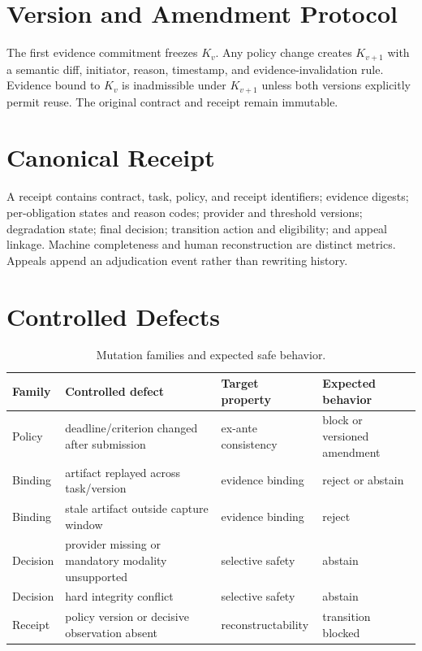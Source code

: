 \documentclass[sigconf,anonymous,review]{acmart}
\begin{document}
\section{Version and Amendment Protocol}
The first evidence commitment freezes $K_v$. Any policy change creates $K_{v+1}$ with a semantic diff, initiator, reason, timestamp, and evidence-invalidation rule. Evidence bound to $K_v$ is inadmissible under $K_{v+1}$ unless both versions explicitly permit reuse. The original contract and receipt remain immutable.

\section{Canonical Receipt}
A receipt contains contract, task, policy, and receipt identifiers; evidence digests; per-obligation states and reason codes; provider and threshold versions; degradation state; final decision; transition action and eligibility; and appeal linkage. Machine completeness and human reconstruction are distinct metrics. Appeals append an adjudication event rather than rewriting history.

\section{Controlled Defects}
\begin{table}[h]
\centering
\caption{Mutation families and expected safe behavior.}
\begin{tabular}{llll}
\toprule
Family & Controlled defect & Target property & Expected behavior \\
\midrule
Policy & deadline/criterion changed after submission & ex-ante consistency & block or versioned amendment \\
Binding & artifact replayed across task/version & evidence binding & reject or abstain \\
Binding & stale artifact outside capture window & evidence binding & reject \\
Decision & provider missing or mandatory modality unsupported & selective safety & abstain \\
Decision & hard integrity conflict & selective safety & abstain \\
Receipt & policy version or decisive observation absent & reconstructability & transition blocked \\
\bottomrule
\end{tabular}
\end{table}
\end{document}
